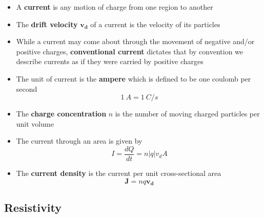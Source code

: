 \documentclass{article}
\begin{document}
\begin{itemize}
  \item A \textbf{current} is any motion of charge from one region to another

  \item The \textbf{drift velocity} $\mathbf{v_d}$ of a current is the velocity of its particles

  \item While a current may come about through the movement of negative and/or positive charges, \textbf{conventional current} dictates that by convention we describe currents as if they were carried by positive charges

  \item The unit of current is the \textbf{ampere} which is defined to be one coulomb per second \[\qty{1}{A} = \qty{1}{C/s}\]

  \item The \textbf{charge concentration} $n$ is the number of moving charged particles per unit volume

  \item The current through an area is given by \[I = \frac{dQ}{dt} = n |q| v_d A\]

  \item The \textbf{current density} is the current per unit cross-sectional area \[\mathbf{J} = n q \mathbf{v_d}\]
\end{itemize}

\subsection{Resistivity}
\end{document}
